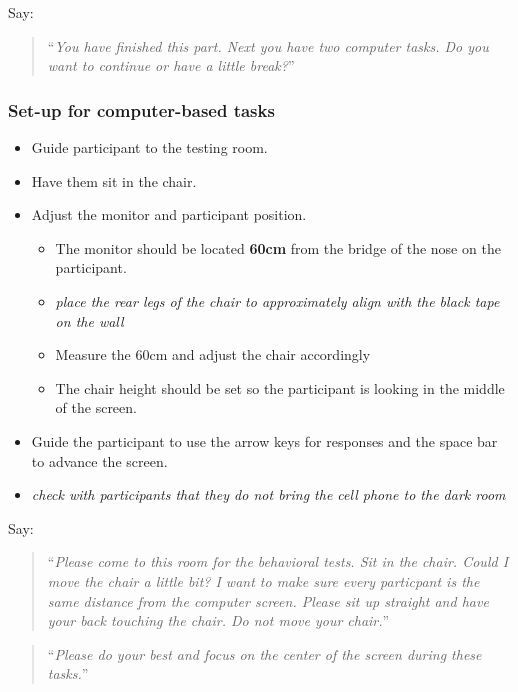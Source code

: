 \documentclass[]{article}
\providecommand{\tightlist}{%
  \setlength{\itemsep}{0pt}\setlength{\parskip}{0pt}}
\begin{document}
Say:

\begin{quote}
``\emph{You have finished this part. Next you have two computer tasks.
Do you want to continue or have a little break?}''
\end{quote}

\hypertarget{set-up-for-computer-based-tasks-1}{%
\subsubsection{Set-up for computer-based
tasks}\label{set-up-for-computer-based-tasks-1}}

\begin{itemize}
\tightlist
\item
  Guide participant to the testing room.
\item
  Have them sit in the chair.
\item
  Adjust the monitor and participant position.

  \begin{itemize}
  \tightlist
  \item
    The monitor should be located \textbf{60cm} from the bridge of the
    nose on the participant.
  \item
    \emph{place the rear legs of the chair to approximately align with
    the black tape on the wall}
  \item
    Measure the 60cm and adjust the chair accordingly
  \item
    The chair height should be set so the participant is looking in the
    middle of the screen.
  \end{itemize}
\item
  Guide the participant to use the arrow keys for responses and the
  space bar to advance the screen.
\item
  \emph{check with participants that they do not bring the cell phone to
  the dark room}
\end{itemize}

Say:

\begin{quote}
``\emph{Please come to this room for the behavioral tests. Sit in the
chair. Could I move the chair a little bit? I want to make sure every
particpant is the same distance from the computer screen. Please sit up
straight and have your back touching the chair. Do not move your
chair.}''
\end{quote}

\begin{quote}
``\emph{Please do your best and focus on the center of the screen during
these tasks.}''
\end{quote}
\end{document}
